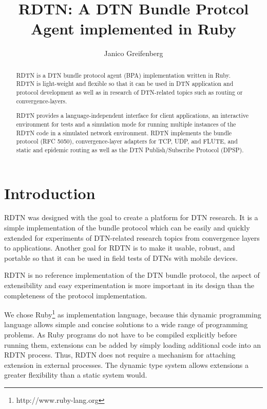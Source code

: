 \documentclass[a4paper]{article}
\begin{document}
\title{RDTN: A DTN Bundle Protcol Agent implemented in Ruby}

\author{Janico Greifenberg}

\maketitle

\begin{abstract}

RDTN is a DTN bundle protocol agent (BPA) implementation written in Ruby. RDTN
is light-weight and flexible so that it can be used in DTN application and
protocol development as well as in research of DTN-related topics such as
routing or convergence-layers. 

RDTN provides a language-independent interface for client applications, an
interactive environment for tests and a simulation mode for running multiple
instances of the RDTN code in a simulated network environment. RDTN implements
the bundle protocol (RFC 5050), convergence-layer adapters for TCP, UDP, and
FLUTE, and static and epidemic routing as well as the DTN Publish/Subscribe
Protocol (DPSP).

\end{abstract}

\section{Introduction}\label{sec.intro}

RDTN was designed with the goal to create a platform for DTN research. It is a
simple implementation of the bundle protocol which can be easily and quickly
extended for experiments of DTN-related research topics from convergence layers
to applications. Another goal for RDTN is to make it usable, robust, and
portable so that it can be used in field tests of DTNs with mobile
devices.

RDTN is no reference implementation of the DTN bundle
protocol, the aspect of extensibility and easy experimentation is more important
in its design than the completeness of the protocol implementation.

We chose Ruby\footnote{http://www.ruby-lang.org} as implementation language,
because this dynamic programming language allows simple and concise solutions to
a wide range of programming problems. As Ruby programs do not have to be
compiled explicitly before running them, extensions can be added by simply
loading additional code into an RDTN process. Thus, RDTN does not require a
mechanism for attaching extension in external processes. The dynamic type system
allows extensions a greater flexibility than a static system would.
\end{document}

